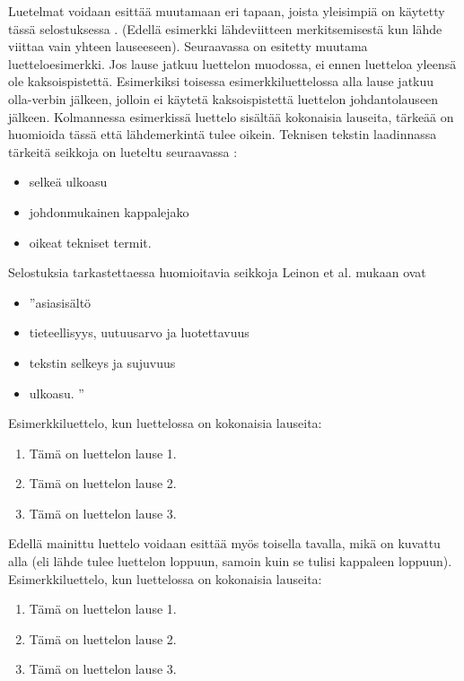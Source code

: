 \documentclass{LUT_pohja}[2016/03/09 LUT Dippa Pohja]
\begin{document}
Luetelmat voidaan esittää muutamaan eri tapaan, joista yleisimpiä on käytetty tässä 
selostuksessa \citep[s.23]{Leino00}. (Edellä esimerkki lähdeviitteen 
merkitsemisestä kun lähde viittaa vain yhteen lauseeseen). Seuraavassa on esitetty 
muutama luetteloesimerkki. Jos lause jatkuu luettelon muodossa, ei ennen luetteloa yleensä ole kaksoispistettä. Esimerkiksi toisessa esimerkkiluettelossa alla lause jatkuu olla-verbin jälkeen, jolloin ei käytetä kaksoispistettä luettelon johdantolauseen jälkeen. Kolmannessa esimerkissä luettelo sisältää kokonaisia lauseita, tärkeää on huomioida tässä että lähdemerkintä tulee oikein. Teknisen tekstin laadinnassa tärkeitä seikkoja on lueteltu seuraavassa \citep[s.20]{Leino00}:
\begin{itemize}[-]
\item selkeä ulkoasu 
\item johdonmukainen kappalejako
\item oikeat tekniset termit.
\end{itemize}
\vspace{1em}
Selostuksia tarkastettaessa huomioitavia seikkoja Leinon et al. \citeyearpar[s. 23]{Leino00} mukaan ovat 
\begin{itemize}[-]
\item ”asiasisältö
\item tieteellisyys, uutuusarvo ja luotettavuus
\item tekstin selkeys ja sujuvuus
\item ulkoasu. ”
\end{itemize}
\vspace{1em}
Esimerkkiluettelo, kun luettelossa on kokonaisia lauseita\citep[s. 23]{Leino00}:
\begin{enumerate}[1),noitemsep, nolistsep, topsep=-1em]
\item Tämä on luettelon lause 1.
\item Tämä on luettelon lause 2.
\item Tämä on luettelon lause 3.
\end{enumerate}
\vspace{1em}
Edellä mainittu luettelo voidaan esittää myös toisella tavalla, mikä on kuvattu alla (eli 
lähde tulee luettelon loppuun, samoin kuin se tulisi kappaleen loppuun). Esimerkkiluettelo, kun luettelossa on kokonaisia lauseita:
\begin{enumerate}[1),noitemsep, nolistsep, topsep=-1em]
\item Tämä on luettelon lause 1.
\item Tämä on luettelon lause 2.
\item Tämä on luettelon lause 3.
\end{enumerate}
\citep[s. 23.]{Leino00}
\end{document}
